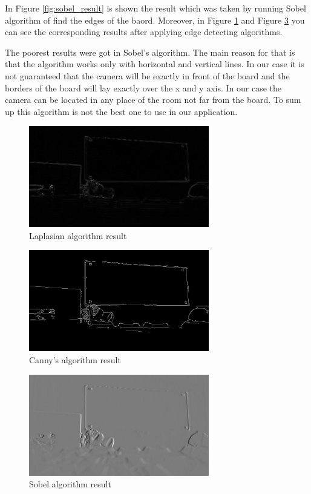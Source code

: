 In Figure \ref{fig:sobel_result} is shown the result which was taken by running Sobel algorithm of find the edges of the baord. Moreover, in Figure \ref{fig:laplasian_result} and Figure \ref{fig:masks_sobel_operator} you can see the corresponding results after applying edge detecting algorithms.

The poorest results were got in Sobel’s algorithm. The main reason for that is that the algorithm works only with horizontal and vertical lines. In our case it is not guaranteed that the camera will be exactly in front of the board and the borders of the board will lay exactly over the x and y axis. In our case the camera can be located in any place of the room not far from the board. To sum up this algorithm is not the best one to use in our application.

\begin{figure}[h]
    \centering
    \includegraphics[width=0.7\textwidth]{Figures/laplasian_result}
    \caption{Laplasian algorithm result}
    \label{fig:laplasian_result}
\end{figure}
\begin{figure}[h]
    \centering
    \includegraphics[width=0.7\textwidth]{Figures/canny_result}
    \caption{Canny's algorithm result}
    \label{fig:masks_sobel_operator}
\end{figure}
\begin{figure}
    \centering
    \includegraphics[width=0.7\textwidth]{Figures/sobel_result}
    \caption{Sobel algorithm result}
    \label{fig:masks_sobel_operator}
\end{figure}

